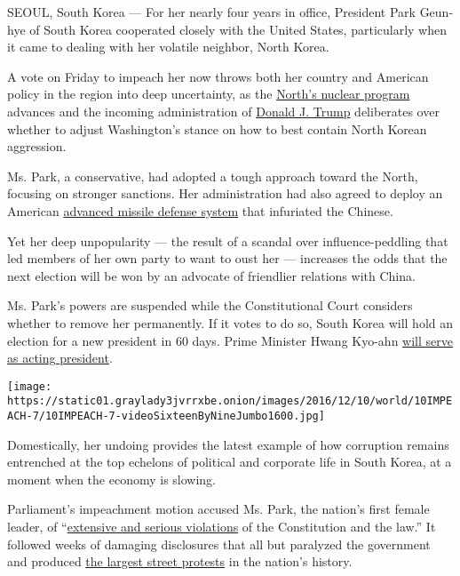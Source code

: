SEOUL, South Korea --- For her nearly four years in office, President
Park Geun-hye of South Korea cooperated closely with the United States,
particularly when it came to dealing with her volatile neighbor, North
Korea.

A vote on Friday to impeach her now throws both her country and American
policy in the region into deep uncertainty, as the
\href{https://www.nytimes3xbfgragh.onion/topic/subject/north-koreas-nuclear-program}{North's
nuclear program} advances and the incoming administration of
\href{http://www.nytimes3xbfgragh.onion/topic/person/donald-trump}{Donald
J. Trump} deliberates over whether to adjust Washington's stance on how
to best contain North Korean aggression.

Ms. Park, a conservative, had adopted a tough approach toward the North,
focusing on stronger sanctions. Her administration had also agreed to
deploy an American
\href{https://www.nytimes3xbfgragh.onion/2016/07/08/world/asia/south-korea-and-us-agree-to-deploy-missile-defense-system.html}{advanced
missile defense system} that infuriated the Chinese.

Yet her deep unpopularity --- the result of a scandal over
influence-peddling that led members of her own party to want to oust her
--- increases the odds that the next election will be won by an advocate
of friendlier relations with China.

Ms. Park's powers are suspended while the Constitutional Court considers
whether to remove her permanently. If it votes to do so, South Korea
will hold an election for a new president in 60 days. Prime Minister
Hwang Kyo-ahn
\href{https://www.nytimes3xbfgragh.onion/2016/12/09/world/asia/south-korea-who-could-replace-park.html}{will
serve as acting president}.

\texttt{[image: https://static01.graylady3jvrrxbe.onion/images/2016/12/10/world/10IMPEACH-7/10IMPEACH-7-videoSixteenByNineJumbo1600.jpg]}

Domestically, her undoing provides the latest example of how corruption
remains entrenched at the top echelons of political and corporate life
in South Korea, at a moment when the economy is slowing.

Parliament's impeachment motion accused Ms. Park, the nation's first
female leader, of
``\href{https://www.nytimes3xbfgragh.onion/2016/12/08/world/asia/south-korea-park-geun-hye-accusations-impeachment.html}{extensive
and serious violations} of the Constitution and the law.'' It followed
weeks of damaging disclosures that all but paralyzed the government and
produced
\href{https://www.nytimes3xbfgragh.onion/2016/11/26/world/asia/korea-park-geun-hye-protests.html}{the
largest street protests} in the nation's history.

